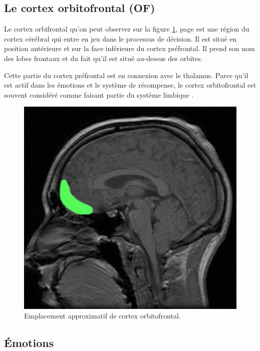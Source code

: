 \subsection{Le cortex orbitofrontal (OF)}

Le cortex orbifrontal qu'on peut observer sur la figure \ref{fig:cortex}, page \pageref{fig:cortex} est une région du cortex cérébral qui entre en jeu dans le processus de décision. Il est situé en position antérieure et sur la face inférieure du cortex préfrontal. Il prend son nom des lobes frontaux et du fait qu'il est situé au-dessus des orbites.


Cette partie du cortex préfrontal est en connexion avec le thalamus. Parce qu'il est actif dans les émotions et le système de récompense, le cortex orbitofrontal est souvent considéré comme faisant partie du système limbique \parencite{cortex}.

\begin{figure}[th]
\centering
\includegraphics{Figures/3}
\decoRule
\caption[Cortex Orbifrontal]{Emplacement approximatif de cortex orbitofrontal.}
\label{fig:cortex}
\end{figure}


\subsection{Émotions}

